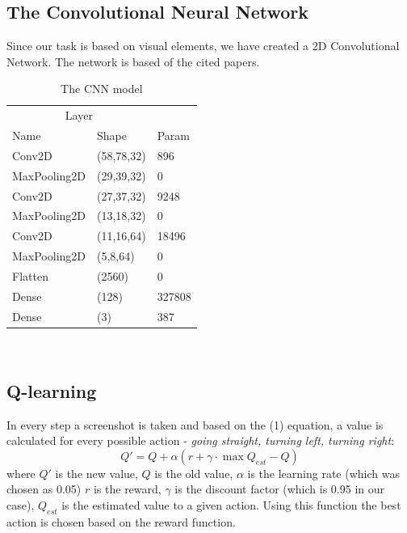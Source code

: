 \documentclass{article}
\begin{document}
\subsection{The Convolutional Neural Network}
Since our task is based on visual elements, we have created a 2D Convolutional Network.\cite{lecun1995convolutional}
The network is based of the cited papers.\cite{Kalapos2020,kalapos2021vision,watkins1992q}
\begin{table}[h]
  
  \label{sample-table}
  \centering
  \begin{tabular}{lll}
    \toprule\toprule
    \multicolumn{2}{c}{Layer} \\
    \cmidrule{1-2}
    Name     & Shape    & Param  \\
    \midrule
    Conv2D & (58,78,32)  &  896    \\
    MaxPooling2D & (29,39,32)  &  0   \\
    Conv2D & (27,37,32)  &  9248    \\
    MaxPooling2D & (13,18,32)  &  0    \\
    Conv2D & (11,16,64)  &  18496    \\
    MaxPooling2D & (5,8,64)  &  0    \\
    Flatten & (2560)  &  0   \\
    Dense & (128)  &  327808    \\
    Dense & (3)  &  387    \\
    \bottomrule
  \end{tabular}\\[5pt]
  \caption{The CNN model}
\end{table}
\subsection{Q-learning}
In every step a screenshot is taken and based on the (1) equation, a value is calculated
for every possible action - \textit{going straight, turning left, turning right}:\cite{watkins1992q}
\begin{equation}
  Q'=Q+\alpha(r+\gamma\cdot \max Q_{est}-Q)
\end{equation}
where $Q'$ is the new value, $Q$ is the old value, $\alpha$ is the learning rate (which was chosen as 0.05)
$r$ is the reward, $\gamma$ is the discount factor (which is 0.95 in our case)\cite{even2003learning}, 
$Q_{est}$ is the estimated value to a given action. Using this function the best action
is chosen based on the reward function.\cite{kalapos2021vision,Kalapos2020}
\end{document}
